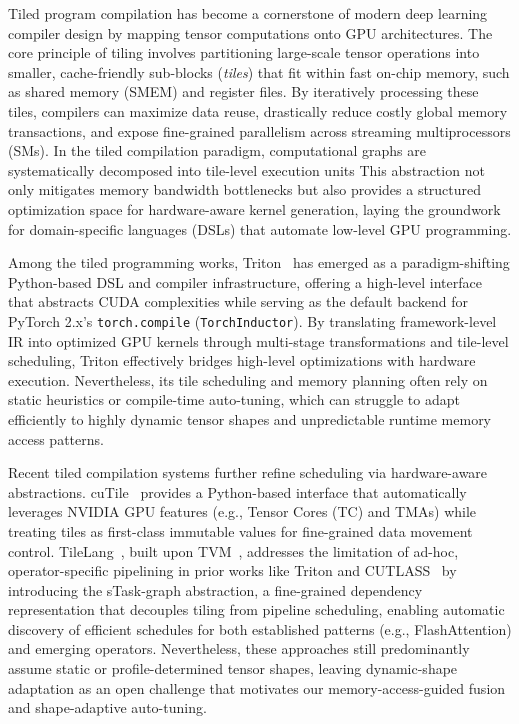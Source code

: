 Tiled program compilation has become a cornerstone of modern deep learning compiler design by mapping tensor computations onto GPU architectures. The core principle of tiling involves partitioning large-scale 
tensor operations into smaller, cache-friendly sub-blocks (\textit{tiles}) that fit within fast on-chip memory, such as 
shared memory (SMEM) and register files. By iteratively processing these tiles, compilers can maximize data reuse, 
drastically reduce costly global memory transactions, and expose fine-grained parallelism across streaming multiprocessors (SMs). In the tiled compilation paradigm, computational graphs are systematically 
decomposed into tile-level execution units
This abstraction not only mitigates memory bandwidth bottlenecks but also provides a structured optimization 
space for hardware-aware kernel generation, laying the groundwork for domain-specific languages (DSLs) that automate low-level 
GPU programming.

Among the tiled programming works, Triton~\cite{tillet2019triton} has emerged as a paradigm-shifting Python-based DSL and 
compiler infrastructure, offering a high-level interface that abstracts CUDA complexities while serving as the default backend 
for PyTorch 2.x's \texttt{torch.compile} (\texttt{TorchInductor}). By translating framework-level IR into optimized GPU kernels 
through multi-stage transformations and tile-level scheduling, Triton effectively bridges high-level optimizations with 
hardware execution. Nevertheless, its tile scheduling and memory planning often rely on static heuristics or compile-time 
auto-tuning, which can struggle to adapt efficiently to highly dynamic tensor shapes and unpredictable runtime memory access 
patterns.

Recent tiled compilation systems further refine scheduling via hardware-aware abstractions. 
cuTile~\cite{nvidia25cutile} provides a Python-based interface that automatically leverages NVIDIA GPU features (e.g., Tensor Cores (TC) and TMAs) while treating tiles as
first-class immutable values for fine-grained data movement control. TileLang~\cite{cheng2025pipethreader}, built upon 
TVM~\cite{chen2018tvm}, addresses the limitation of ad-hoc, operator-specific pipelining in prior works like Triton and 
CUTLASS~\cite{nvidia22cutlass} by introducing the sTask-graph abstraction, a fine-grained dependency representation that 
decouples tiling from pipeline scheduling, enabling automatic discovery of efficient schedules for both established patterns 
(e.g., FlashAttention) and emerging operators. Nevertheless, these approaches still predominantly assume static or profile-determined 
tensor shapes, leaving dynamic-shape adaptation as an open challenge that motivates our memory-access-guided fusion and 
shape-adaptive auto-tuning.

